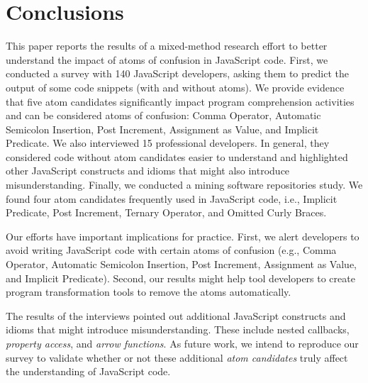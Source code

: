 \section{Conclusions}
\label{conclusion}

This paper reports the results of a mixed-method research effort to better understand the impact of atoms of confusion in JavaScript code. First, we conducted a survey with 140 JavaScript developers, asking them to predict the output of some code snippets (with and without atoms). We provide evidence that five atom candidates significantly impact program comprehension activities and can be considered atoms of confusion: Comma Operator, Automatic Semicolon Insertion, Post Increment, Assignment as Value, and Implicit Predicate. 
We also interviewed 15 professional developers. In general, they considered code without atom candidates easier to understand and highlighted other JavaScript constructs and idioms that might also introduce misunderstanding. 
Finally, we conducted a mining software repositories study. We found four atom candidates frequently used in JavaScript code, i.e., Implicit Predicate, Post Increment, Ternary Operator, and Omitted Curly Braces.  %

Our efforts have important implications for practice. First, we alert developers to avoid writing JavaScript code with certain atoms of confusion (e.g., Comma Operator, Automatic Semicolon Insertion, Post Increment, Assignment as Value, and Implicit Predicate). Second, our results might help tool developers to create program transformation tools to remove the atoms automatically. 

The results of the interviews pointed out additional JavaScript constructs and idioms 
that might introduce misunderstanding. These include nested callbacks, %
\emph{property access}, and \emph{arrow functions}. As future work, we intend to
reproduce our survey to validate whether or not these additional
\emph{atom candidates}
truly affect
the understanding of JavaScript code. 

